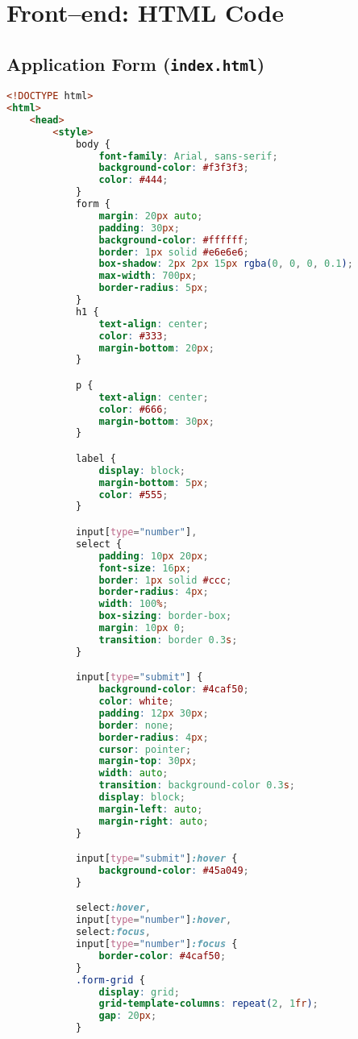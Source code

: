 \section{Front--end: HTML Code}
\subsection{Application Form (\lstinline{index.html})}
\begin{lstlisting}[language=HTML, basicstyle=\footnotesize\ttfamily]
<!DOCTYPE html>
<html>
	<head>
		<style>
			body {
				font-family: Arial, sans-serif;
				background-color: #f3f3f3;
				color: #444;
			}
			form {
				margin: 20px auto;
				padding: 30px;
				background-color: #ffffff;
				border: 1px solid #e6e6e6;
				box-shadow: 2px 2px 15px rgba(0, 0, 0, 0.1);
				max-width: 700px;
				border-radius: 5px;
			}
			h1 {
				text-align: center;
				color: #333;
				margin-bottom: 20px;
			}

			p {
				text-align: center;
				color: #666;
				margin-bottom: 30px;
			}

			label {
				display: block;
				margin-bottom: 5px;
				color: #555;
			}

			input[type="number"],
			select {
				padding: 10px 20px;
				font-size: 16px;
				border: 1px solid #ccc;
				border-radius: 4px;
				width: 100%;
				box-sizing: border-box;
				margin: 10px 0;
				transition: border 0.3s;
			}

			input[type="submit"] {
				background-color: #4caf50;
				color: white;
				padding: 12px 30px;
				border: none;
				border-radius: 4px;
				cursor: pointer;
				margin-top: 30px;
				width: auto;
				transition: background-color 0.3s;
				display: block;
				margin-left: auto;
				margin-right: auto;
			}

			input[type="submit"]:hover {
				background-color: #45a049;
			}

			select:hover,
			input[type="number"]:hover,
			select:focus,
			input[type="number"]:focus {
				border-color: #4caf50;
			}
			.form-grid {
				display: grid;
				grid-template-columns: repeat(2, 1fr);
				gap: 20px;
			}


\end{lstlisting}
